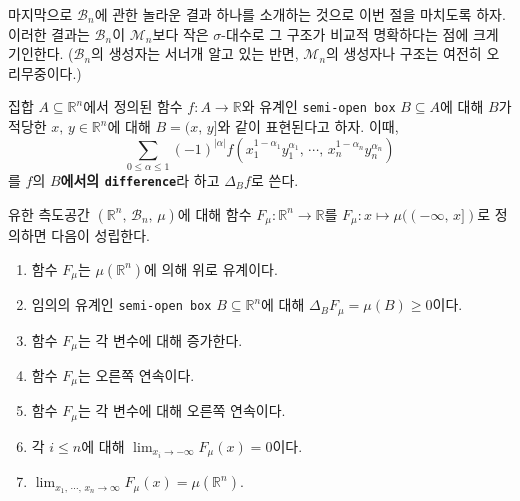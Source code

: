 마지막으로 $\mathcal{B}_n$에 관한 놀라운 결과 하나를 소개하는 것으로 이번 절을 마치도록 하자. 이러한 결과는 $\mathcal{B}_n$이 $\mathcal{M}_n$보다 작은 $\sigma$-대수로 그 구조가 비교적 명확하다는 점에 크게 기인한다. ($\mathcal{B}_n$의 생성자는 서너개 알고 있는 반면, $\mathcal{M}_n$의 생성자나 구조는 여전히 오리무중이다.)

\begin{definition}
    집합 $A\subseteq\mathbb{R}^n$에서 정의된 함수 $f:A\to\mathbb{R}$와 유계인 \texttt{semi-open box} $B\subseteq A$에 대해 $B$가 적당한 $x,\,y\in\mathbb{R}^n$에 대해 $B=(x,\,y]$와 같이 표현된다고 하자. 이때,
    \begin{equation*}
        \sum_{0\leq\alpha\leq1}(-1)^{|\alpha|}f(x_1^{1-\alpha_1}y_1^{\alpha_1},\,\cdots,\,x_n^{1-\alpha_n}y_n^{\alpha_n})
    \end{equation*}
     를 $f$의 \textbf{$B$에서의 \texttt{difference}}라 하고 $\Delta_Bf$로 쓴다.
\end{definition}

\begin{theorem}\label{thm:distributionProp}
    유한 측도공간 $(\mathbb{R}^n,\,\mathcal{B}_n,\,\mu)$에 대해 함수 $F_\mu:\mathbb{R}^n\to\mathbb{R}$를 $F_\mu:x\mapsto\mu((-\infty,\,x])$로 정의하면 다음이 성립한다.

    \begin{enumerate}
        \item 함수 $F_\mu$는 $\mu(\mathbb{R}^n)$에 의해 위로 유계이다.
        \item 임의의 유계인 \texttt{semi-open box} $B\subseteq\mathbb{R}^n$에 대해 $\Delta_BF_\mu=\mu(B)\geq0$이다.
        \item 함수 $F_\mu$는 각 변수에 대해 증가한다.
        \item 함수 $F_\mu$는 오른쪽 연속이다.
        \item 함수 $F_\mu$는 각 변수에 대해 오른쪽 연속이다.
        \item 각 $i\leq n$에 대해 $\lim_{x_i\to-\infty}F_\mu(x)=0$이다.
        \item $\lim_{x_1,\,\cdots,\,x_n\to\infty}F_\mu(x)=\mu(\mathbb{R}^n)$.
    \end{enumerate}
\end{theorem}

